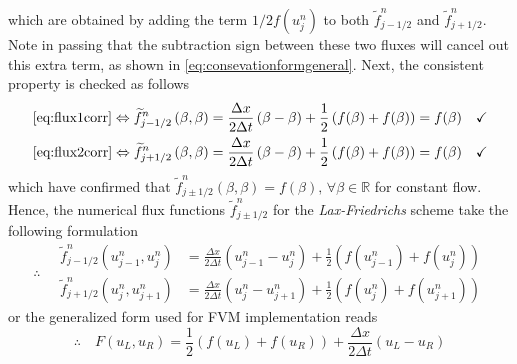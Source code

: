 \documentclass[12pt]{article}
\begin{document}
which are obtained by adding the term $1/2f(u_{j}^{n})$ to both 
$\widetilde{f}_{j-1/2}^{n}$ and $\widetilde{f}_{j+1/2}^{n}$. 
Note in passing that the subtraction sign between these two fluxes will 
cancel out this extra term, as shown in \eqref{eq:consevationformgeneral}.
Next, the consistent property is checked as follows
\begin{align}
	\eqref{eq:flux1corr} \Leftrightarrow
	\widetilde{f}_{j-1/2}^{n} \left(\beta, \beta\right) & =  
	\frac{\Delta x}{2\Delta t}\left(\beta - \beta \right)
	+ \frac{1}{2}\left(f(\beta)+f(\beta)\right)  
	=f(\beta) \quad \checkmark                                \\
	\eqref{eq:flux2corr} \Leftrightarrow
	\widetilde{f}_{j+1/2}^{n} \left(\beta, \beta\right) & =  
	\frac{\Delta x}{2\Delta t}\left(\beta - \beta \right)
	+\frac{1}{2} \left(f(\beta)+f(\beta)\right)  
	=f(\beta) \quad \checkmark
\end{align}
which have confirmed that 
$\widetilde{f}_{j\pm 1/2}^{n} \left(\beta, \beta\right) = f(\beta),\, \forall \beta \in \mathbb{R}$
for constant flow. Hence, the numerical flux functions $\widetilde{f}_{j\pm 1/2}^{n}$
for the \emph{Lax-Friedrichs} scheme take the following formulation 
\begin{equation}
	\therefore\quad
	\boxed{
		\begin{aligned}
			\widetilde{f}_{j-1/2}^{n} \left(u_{j-1}^{n}, u_{j}^{n}\right)
			 & =
			\frac{\Delta x}{2\Delta t}\left(u_{j-1}^{n} - u_{j}^{n} \right)
			+\frac{1}{2}
			\left(f(u_{j-1}^{n}) + f(u_{j}^{n}) \right) \\
			\widetilde{f}_{j+1/2}^{n} \left(u_{j}^{n}, u_{j+1}^{n}\right)
			 & =
			\frac{\Delta x}{2\Delta t}\left(u_{j}^{n} - u_{j+1}^{n} \right)
			+\frac{1}{2}
			\left(f(u_{j}^{n}) + f(u_{j+1}^{n}) \right)
		\end{aligned}
	}
\end{equation}
or the generalized form used for FVM implementation reads
\begin{equation}
	\therefore\quad
	\boxed{
		F\left(u_L, u_R \right) =
		\frac{1}{2} \left(f(u_L) + f(u_R) \right)
		+\frac{\Delta x}{2\Delta t}\left(u_L - u_R \right)
	}
\end{equation}
\end{document}

